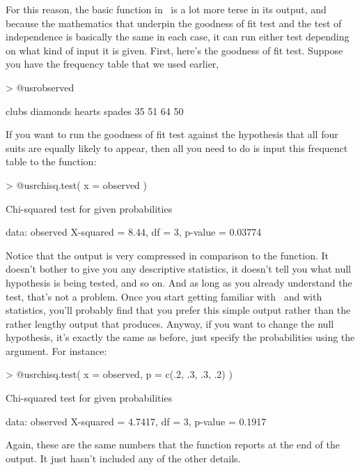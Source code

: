 For this reason, the basic  function in \R\ is a lot more terse in its output, and because the mathematics that underpin the goodness of fit test and the test of independence is basically the same in each case, it can run either test depending on what kind of input it is given. First, here's the goodness of fit test. Suppose you have the frequency table  that we used earlier,
\begin{rblock1}
> @usr{observed}

   clubs diamonds   hearts   spades 
      35       51       64       50 
\end{rblock1}
If you want to run the goodness of fit test against the hypothesis that all four suits are equally likely to appear, then all you need to do is input this frequenct table to the  function:
\begin{rblock1}
> @usr{chisq.test( x = observed )}

	Chi-squared test for given probabilities

data:  observed
X-squared = 8.44, df = 3, p-value = 0.03774
\end{rblock1}
Notice that the output is very compressed in comparison to the  function. It doesn't bother to give you any descriptive statistics, it doesn't tell you what null hypothesis is being tested, and so on. And as long as you already understand the test, that's not a problem. Once you start getting familiar with \R\ and with statistics, you'll probably find that you prefer this simple output rather than the rather lengthy output that   produces. Anyway, if you want to change the null hypothesis, it's exactly the same as before, just specify the probabilities using the  argument. For instance:
\begin{rblock1}
> @usr{chisq.test( x = observed, p = c(.2, .3, .3, .2) )}

	Chi-squared test for given probabilities

data:  observed
X-squared = 4.7417, df = 3, p-value = 0.1917
\end{rblock1} 
Again, these are the same numbers that the  function reports at the end of the output. It just hasn't included any of the other details.

